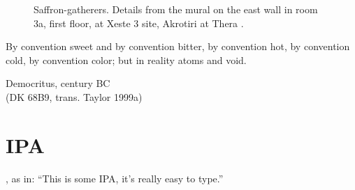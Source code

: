 \begin{figure}[!hbt]
    \centering
    \hfill
    \caption{Saffron-gatherers. Details from the mural on the east wall in room 3a, first floor, at Xeste 3 site, Akrotiri at Thera \parencite[152]{doumas_wall-paintings_1992}.}
    \label{fig:saffron_gatherers}
\end{figure}

\epigraph{By convention sweet and by convention bitter, by convention hot, by convention cold, by convention color; but in reality atoms and void.}{Democritus,  century BC\\(DK 68B9, trans. Taylor 1999a)}


\section{IPA}

\textipa{[ðIsIzsAmaIpeI]},  as in: ``This is some IPA, it's really easy to type.''

